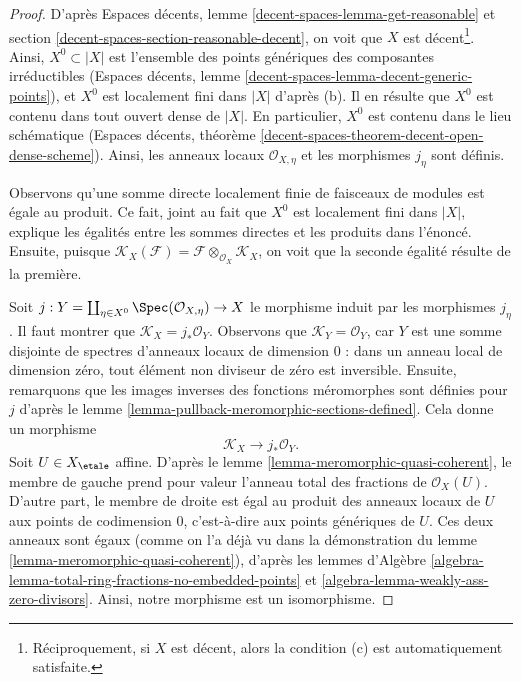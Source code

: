 \begin{proof}
D'après Espaces décents, lemme \ref{decent-spaces-lemma-get-reasonable} et
section \ref{decent-spaces-section-reasonable-decent},
on voit que $X$ est décent\footnote{Réciproquement, si $X$ est décent,
alors la condition (c) est automatiquement satisfaite.}.
Ainsi, $X^0 \subset |X|$ est l'ensemble des points génériques des composantes
irréductibles
(Espaces décents, lemme \ref{decent-spaces-lemma-decent-generic-points}),
et $X^0$ est localement fini dans $|X|$ d'après (b).
Il en résulte que $X^0$ est contenu dans tout ouvert dense de $|X|$.
En particulier, $X^0$ est contenu dans le lieu schématique
(Espaces décents, théorème \ref{decent-spaces-theorem-decent-open-dense-scheme}).
Ainsi, les anneaux locaux $\mathcal{O}_{X, \eta}$ et les morphismes $j_\eta$
sont définis.

\medskip\noindent
Observons qu'une somme directe localement finie de faisceaux de modules
est égale au produit. Ce fait, joint au fait que $X^0$ est localement
fini dans $|X|$, explique les égalités entre
les sommes directes et les produits dans l'énoncé.
Ensuite, puisque $\mathcal{K}_X(\mathcal{F}) =
\mathcal{F} \otimes_{\mathcal{O}_X} \mathcal{K}_X$,
on voit que la seconde égalité résulte de la première.

\medskip\noindent
Soit
$j : Y = \coprod\nolimits_{\eta \in X^0} \Spec(\mathcal{O}_{X, \eta}) \to X$
le morphisme induit par les morphismes $j_\eta$.
Il faut montrer que $\mathcal{K}_X = j_*\mathcal{O}_Y$.
Observons que $\mathcal{K}_Y = \mathcal{O}_Y$, car $Y$ est une somme
disjointe de spectres d'anneaux locaux de dimension $0$ : dans un anneau local
de dimension zéro, tout élément non diviseur de zéro est inversible.
Ensuite, remarquons que les images inverses des fonctions méromorphes
sont définies pour $j$ d'après le
lemme \ref{lemma-pullback-meromorphic-sections-defined}.
Cela donne un morphisme
$$
\mathcal{K}_X \longrightarrow j_*\mathcal{O}_Y.
$$
Soit $U \in X_\etale$ affine. D'après le lemme \ref{lemma-meromorphic-quasi-coherent},
le membre de gauche prend pour valeur l'anneau total des fractions de $\mathcal{O}_X(U)$.
D'autre part, le membre de droite est égal au produit des
anneaux locaux de $U$ aux points de codimension $0$, c'est-à-dire aux points génériques
de $U$. Ces deux anneaux sont égaux (comme on l'a déjà vu dans la démonstration
du lemme \ref{lemma-meromorphic-quasi-coherent}), d'après les lemmes
d'Algèbre
\ref{algebra-lemma-total-ring-fractions-no-embedded-points} et
\ref{algebra-lemma-weakly-ass-zero-divisors}.
Ainsi, notre morphisme est un isomorphisme.


\end{proof}
